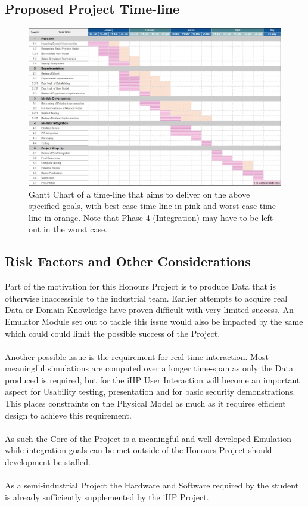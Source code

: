 \documentclass{article}
\begin{document}
\subsection{Proposed Project Time-line}

\begin{figure}[h]
    \centering
    \includegraphics[width=\linewidth]{ProjectPlan.jpg}
    \caption{Gantt Chart of a time-line that aims to deliver on the above specified goals, with best case time-line in pink and worst case time-line in orange.
    Note that Phase 4 (Integration) may have to be left out in the worst case.
    }
    \label{fig:gantt}
\end{figure}

\subsection{Risk Factors and Other Considerations}
Part of the motivation for this Honours Project is to produce Data that is otherwise inaccessible to the industrial team. Earlier attempts to acquire real Data or Domain Knowledge have proven difficult with very limited success. An Emulator Module set out to tackle this issue would also be impacted by the same which could could limit the possible success of the Project.
\\\\Another possible issue is the requirement for real time interaction. Most meaningful simulations are computed over a longer time-span as only the Data produced is required, but for the iHP User Interaction will become an important aspect for Usability testing, presentation and for basic security demonstrations. This places constraints on the Physical Model as much as it requires efficient design to achieve this requirement.
\\\\As such the Core of the Project is a meaningful and well developed Emulation while integration goals can be met outside of the Honours Project should development be stalled.
\\\\As a semi-industrial Project the Hardware and Software required by the student is already sufficiently supplemented by the iHP Project.








\clearpage
\nocite{gasBook,dataBook,cloudOil,chickenEgg,hydrateFormation}

\end{document}
